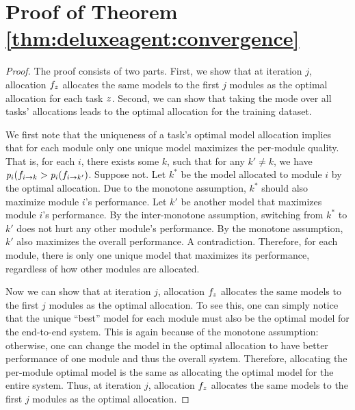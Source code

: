 \section{Proof of Theorem \ref{thm:deluxeagent:convergence}}
\begin{proof}
The proof consists of two parts. First, we show that at iteration $j$, allocation $f_z$ allocates the same models to the first $j$ modules as the optimal allocation for each task $z$. Second, we can show that taking the mode over all tasks' allocations leads to the optimal allocation for the training dataset.    

We first note that the uniqueness of a task's optimal model allocation implies that for each module only one unique model maximizes the per-module quality. That is, for each $i$, there exists some $k$, such that for any $k'\not=k$, we have $\mathit{p}_i(f_{i\rightarrow k} > \mathit{p}_i(f_{i\rightarrow k'})$. Suppose not. Let $k^*$ be the model allocated to module $i$ by the optimal allocation. Due to the monotone assumption, $k^*$ should also maximize module $i$'s performance. Let $k'$ be another model that maximizes module $i$'s performance. By the inter-monotone assumption, switching from $k^*$ to $k'$ does not hurt any other module's performance. By the monotone assumption, $k'$ also maximizes the overall performance. A contradiction. Therefore, for each module, there is only one unique model that maximizes its performance, regardless of how other modules are allocated. 

Now we can show that at iteration $j$, allocation $f_z$ allocates the same models to the first $j$ modules as the optimal allocation. To see this, one can simply notice that the unique ``best'' model for each module must also be the optimal model for the end-to-end system. This is again because of the monotone assumption: otherwise, one can change the model in the optimal allocation to have better performance of one module and thus the overall system.  Therefore, allocating the per-module optimal model is the same as allocating the optimal model for the entire system. Thus, at iteration $j$, allocation $f_z$ allocates the same models to the first $j$ modules as the optimal allocation.


\end{proof}
